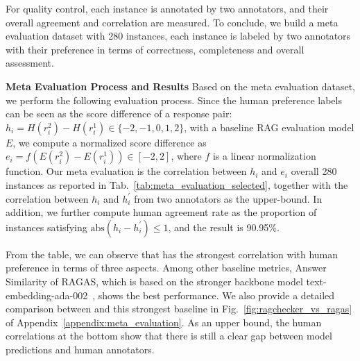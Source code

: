 For quality control, each instance is annotated by two annotators, and their overall agreement and correlation are measured. To conclude, we build a meta evaluation dataset with 280 instances, each instance is labeled by two annotators with their preference in terms of correctness, completeness and overall assessment.

\textbf{Meta Evaluation Process and Results} Based on the meta evaluation dataset, we perform the following evaluation process. Since the human preference labels can be seen as the score difference of a response pair: $h_i = H(r_i^2) - H(r_i^1) \in \{-2, -1, 0, 1, 2\}$, with a baseline RAG evaluation model $E$, we compute a normalized score difference as $e_i = f(E(r_i^2) - E(r_i^1)) \in [-2, 2]$, where $f$ is a linear normalization function. Our meta evaluation is the correlation between $h_i$ and $e_i$ overall 280 instances as reported in Tab.~\ref{tab:meta_evaluation_selected}, together with the correlation between $h_i$ and $h_i^\prime$ from two annotators as the upper-bound. In addition, we further compute human agreement rate as the proportion of instances satisfying $\text{abs}(h_i - h_i^\prime)\leq 1$, and the result is 90.95\%.




From the table, we can observe that \benchname\space has the strongest correlation with human preference in terms of three aspects. Among other baseline metrics, Answer Similarity of RAGAS, which is based on the stronger backbone model text-embedding-ada-002~\cite{neelakantan2022text}, shows the best performance. We also provide a detailed comparison between \benchname\space and this strongest baseline in Fig.~\ref{fig:ragchecker_vs_ragas} of Appendix~\ref{appendix:meta_evaluation}. As an upper bound, the human correlations at the bottom show that there is still a clear gap between model predictions and human annotators.


